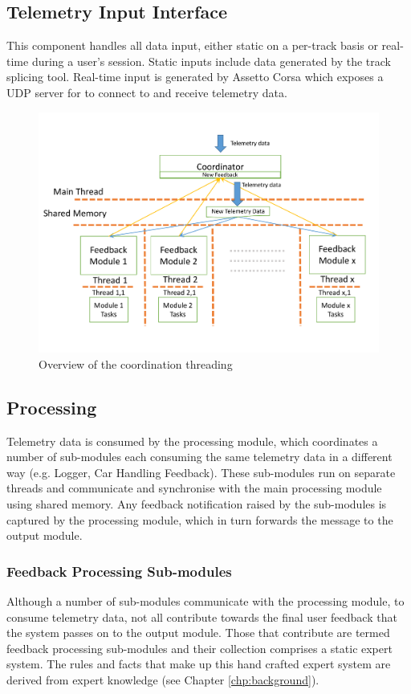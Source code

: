 \subsection{Telemetry Input Interface}
This component handles all data input, either static on a per-track basis or real-time during a user's session. Static inputs include data generated by the track splicing tool. Real-time input is generated by Assetto Corsa which exposes a UDP server for \methodname to connect to and receive telemetry data.

\begin{figure}[!htb]
	\centering
	\includegraphics[width=\textwidth]{diagrams/multithreading.pdf}
	\caption{Overview of the coordination threading}
	\label{fig:multithreading}
\end{figure}

\subsection{Processing}
Telemetry data is consumed by the processing module, which coordinates a number of sub-modules each consuming the same telemetry data in a different way (e.g. Logger, Car Handling Feedback). These sub-modules run on separate threads and communicate and synchronise with the main processing module using shared memory. Any feedback notification raised by the sub-modules is captured by the processing module, which in turn forwards the message to the output module.

\subsubsection{Feedback Processing Sub-modules}
Although a number of sub-modules communicate with the processing module, to consume telemetry data, not all contribute towards the final user feedback that the system passes on to the output module. Those that contribute are termed feedback processing sub-modules and their collection comprises a static expert system. The rules and facts that make up this hand crafted expert system are derived from expert knowledge (see Chapter \ref{chp:background}).

